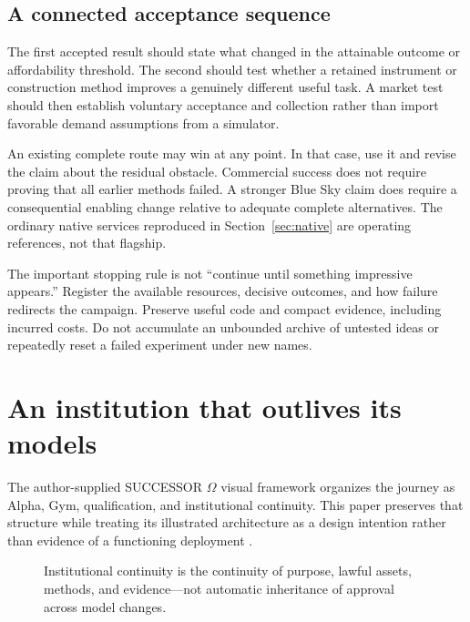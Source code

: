 \documentclass[11pt,letterpaper]{article}
\theoremstyle{remark}\newtheorem{remark}{Remark}[section]
\begin{document}
\subsection{A connected acceptance sequence}
The first accepted result should state what changed in the attainable outcome or affordability threshold. The second should test whether a retained instrument or construction method improves a genuinely different useful task. A market test should then establish voluntary acceptance and collection rather than import favorable demand assumptions from a simulator.

An existing complete route may win at any point. In that case, use it and revise the claim about the residual obstacle. Commercial success does not require proving that all earlier methods failed. A stronger Blue Sky claim does require a consequential enabling change relative to adequate complete alternatives. The ordinary native services reproduced in Section~\ref{sec:native} are operating references, not that flagship.

The important stopping rule is not ``continue until something impressive appears.'' Register the available resources, decisive outcomes, and how failure redirects the campaign. Preserve useful code and compact evidence, including incurred costs. Do not accumulate an unbounded archive of untested ideas or repeatedly reset a failed experiment under new names.

\section{An institution that outlives its models}\label{sec:institution}
The author-supplied SUCCESSOR $\Omega$ visual framework organizes the journey as Alpha, Gym, qualification, and institutional continuity. This paper preserves that structure while treating its illustrated architecture as a design intention rather than evidence of a functioning deployment \citep{boucher2026notes}.

\begin{figure}[H]
\centering
{}
\caption{Institutional continuity is the continuity of purpose, lawful assets, methods, and evidence---not automatic inheritance of approval across model changes.}
\end{figure}
\end{document}
